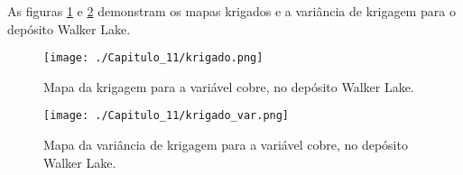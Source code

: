 As figuras \ref{krigado_gslib} e \ref{krigado_var_gslib} demonstram os mapas krigados e a variância de krigagem para o depósito Walker Lake. 

\FloatBarrier
\begin{figure}[h]
	\centering
	\texttt{[image: ./Capitulo\_11/krigado.png]}
	\caption{ Mapa da krigagem para a variável cobre, no depósito Walker Lake.}
	\label{krigado_gslib}
\end{figure}
\FloatBarrier

\FloatBarrier
\begin{figure}[h]
	\centering
	\texttt{[image: ./Capitulo\_11/krigado\_var.png]}	
	\caption{ Mapa da variância de krigagem para a variável cobre, no depósito Walker Lake.}
	\label{krigado_var_gslib}
\end{figure}
\FloatBarrier
